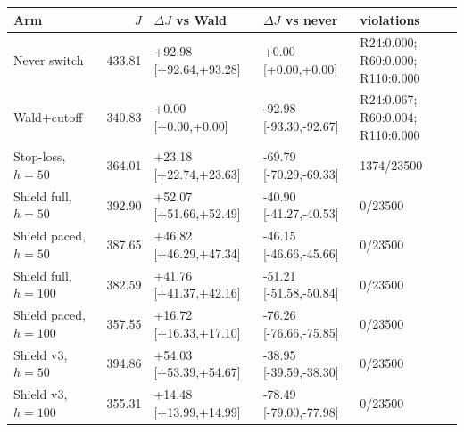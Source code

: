 \begin{tabular}{@{}l r l l l@{}}
\toprule
Arm & $J$ & $\Delta J$ vs Wald & $\Delta J$ vs never & violations \\
\midrule
Never switch & 433.81 & +92.98 [+92.64,+93.28] & +0.00 [+0.00,+0.00] & R24:0.000; R60:0.000; R110:0.000 \\
Wald+cutoff & 340.83 & +0.00 [+0.00,+0.00] & -92.98 [-93.30,-92.67] & R24:0.067; R60:0.004; R110:0.000 \\
Stop-loss, $h=50$ & 364.01 & +23.18 [+22.74,+23.63] & -69.79 [-70.29,-69.33] & 1374/23500 \\
Shield full, $h=50$ & 392.90 & +52.07 [+51.66,+52.49] & -40.90 [-41.27,-40.53] & 0/23500 \\
Shield paced, $h=50$ & 387.65 & +46.82 [+46.29,+47.34] & -46.15 [-46.66,-45.66] & 0/23500 \\
Shield full, $h=100$ & 382.59 & +41.76 [+41.37,+42.16] & -51.21 [-51.58,-50.84] & 0/23500 \\
Shield paced, $h=100$ & 357.55 & +16.72 [+16.33,+17.10] & -76.26 [-76.66,-75.85] & 0/23500 \\
Shield v3, $h=50$ & 394.86 & +54.03 [+53.39,+54.67] & -38.95 [-39.59,-38.30] & 0/23500 \\
Shield v3, $h=100$ & 355.31 & +14.48 [+13.99,+14.99] & -78.49 [-79.00,-77.98] & 0/23500 \\
\bottomrule
\end{tabular}
